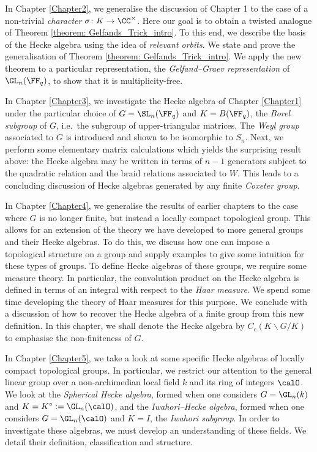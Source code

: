 In Chapter \ref{Chapter2}, we generalise the discussion of Chapter 1 to the case of a non-trivial \emph{character} $\sigma\colon K\to\CC^\times$.
Here our goal is to obtain a twisted analogue of Theorem \ref{theorem: Gelfands_Trick_intro}.
To this end, we describe the basis of the Hecke algebra using the idea of \emph{relevant orbits}.
We state and prove the generalisation of Theorem \ref{theorem: Gelfands_Trick_intro}.
We apply the new theorem to a particular representation, the \emph{Gelfand--Graev representation} of $\GL_n(\FF_q)$, to show that it is multiplicity-free.

In Chapter \ref{Chapter3}, we investigate the Hecke algebra of Chapter \ref{Chapter1} under the particular choice of $G=\SL_n(\FF_q)$ and $K=B(\FF_q)$, the \emph{Borel subgroup} of $G$, i.e.\ the subgroup of upper-triangular matrices.
The \emph{Weyl group} associated to $G$ is introduced and shown to be isomorphic to $S_n$.
Next, we perform some elementary matrix calculations which yields the surprising result above: the Hecke algebra may be written in terms of $n-1$ generators subject to the quadratic relation and the braid relations associated to $W$.
This leads to a concluding discussion of Hecke algebras generated by any finite \emph{Coxeter group}.

In Chapter \ref{Chapter4}, we generalise the results of earlier chapters to the case where $G$ is no longer finite, but instead a locally compact topological group.
This allows for an extension of the theory we have developed to more general groups and their Hecke algebras.
To do this, we discuss how one can impose a topological structure on a group and supply examples to give some intuition for these types of groups.
To define Hecke algebras of these groups, we require some measure theory.
In particular, the convolution product on the Hecke algebra is defined in terms of an integral with respect to the \emph{Haar measure}.
We spend some time developing the theory of Haar measures for this purpose.
We conclude with a discussion of how to recover the Hecke algebra of a finite group from this new definition.
In this chapter, we shall denote the Hecke algebra by $C_c(K\backslash G/K)$ to emphasise the non-finiteness of $G$.

In Chapter \ref{Chapter5}, we take a look at some specific Hecke algebras of locally compact topological groups.
In particular, we restrict our attention to the general linear group over a non-archimedian local field $k$ and its ring of integers $\calO$.
We look at the \emph{Spherical Hecke algebra}, formed when one considers $G=\GL_n(k)$ and $K=K^\circ := \GL_n(\calO)$, and the \emph{Iwahori--Hecke algebra}, formed when one considers $G=\GL_n(\calO)$ and $K=I$, the \emph{Iwahori subgroup}.
In order to investigate these algebras, we must develop an understanding of these fields.
We detail their definition, classification and structure.

